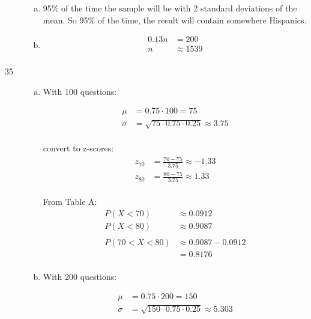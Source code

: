 \documentclass[letterpaper]{exam}
\begin{document}
\begin{description}
\begin{enumerate}[(a)]
          \item 95\% of the time the sample will be with 2 standard deviations
            of the mean. So 95\% of the time, the result will contain somewhere
             Hispanics.

          \item 
            \begin{align*}
              0.13 n & = 200 \\
              n      & \approx \boxed{ 1539 } \\
            \end{align*}
        
        \end{enumerate}

      \item[35]
        \begin{enumerate}[(a)]
          \item
            With 100 questions:

            \begin{align*}
              \mu    & = 0.75 \cdot 100 = 75 \\
              \sigma & = \sqrt{75 \cdot 0.75 \cdot 0.25} \approx 3.75 \\
            \end{align*}

            convert to z-scores:
            \begin{align*}
              z_{70} &= \frac{70 - 75}{3.75} \approx -1.33 \\
              z_{80} &= \frac{80 - 75}{3.75} \approx 1.33 \\
            \end{align*}

            From Table A:
            \begin{align*}
              P(X < 70) & \approx 0.0912 \\
              P(X < 80) & \approx 0.9087 \\
              \\
              P(70 < X < 80) & \approx 0.9087 - 0.0912 \\
                             & = 0.8176 \\
            \end{align*}

          \item
            With 200 questions:

            \begin{align*}
              \mu    & = 0.75 \cdot 200 = 150 \\
              \sigma & = \sqrt{150 \cdot 0.75 \cdot 0.25} \approx 5.303 \\
            \end{align*}


\end{enumerate}
\end{description}
\end{document}
